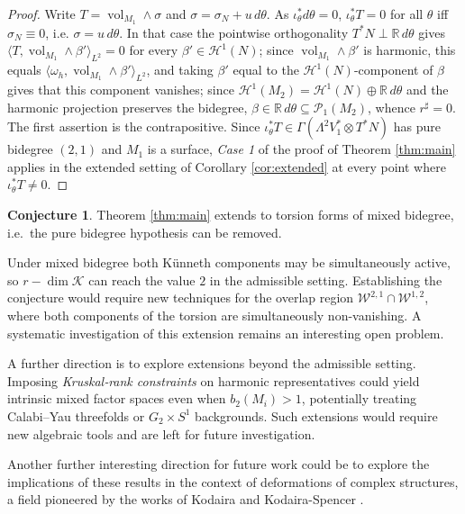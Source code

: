 \documentclass[11pt,reqno]{amsart}
\theoremstyle{plain}
\theoremstyle{definition}
\newtheorem{conjecture}[theorem]{Conjecture}
\numberwithin{equation}{section}
\begin{document}
\begin{proof}
Write $T=\operatorname{vol}_{M_1}\wedge\sigma$ and $\sigma=\sigma_N+u\,d\theta$.
As $\iota_\theta^{*}d\theta=0$, $\iota_\theta^{*}T=0$ for all $\theta$ iff $\sigma_N\equiv0$, i.e. $\sigma=u\,d\theta$.  In that case the pointwise orthogonality $T^{*}N\perp\mathbb{R}\,d\theta$ gives $\langle T,\operatorname{vol}_{M_1}\wedge\beta'\rangle_{L^2}=0$ for every $\beta'\in\mathcal{H}^{1}(N)$; since $\operatorname{vol}_{M_1}\wedge\beta'$ is harmonic, this equals $\langle\omega_h,\operatorname{vol}_{M_1}\wedge\beta'\rangle_{L^2}$, and taking $\beta'$ equal to the $\mathcal{H}^{1}(N)$-component of $\beta$ gives that this component vanishes; since
$\mathcal{H}^{1}(M_2)=\mathcal{H}^{1}(N)\oplus\mathbb{R}\,d\theta$ and the
harmonic projection preserves the bidegree, $\beta\in\mathbb{R}\,d\theta
\subseteq\mathcal{P}_1(M_2)$, whence $r^{\sharp}=0$.  The first assertion is the contrapositive.  Since $\iota_\theta^{*}T\in\Gamma(\Lambda^2V_1^{*}\otimes T^{*}N)$
has pure bidegree $(2,1)$ and $M_1$ is a surface, \emph{Case 1} of the proof of Theorem \ref{thm:main} applies in the extended setting of Corollary \ref{cor:extended} at every point where $\iota_\theta^{*}T\neq0$.
\end{proof}

\begin{conjecture}\label{conj:mixed}
Theorem \ref{thm:main} extends to torsion forms of mixed bidegree, i.e.\ the pure bidegree hypothesis can be removed.
\end{conjecture}

Under mixed bidegree both K\"unneth components may be simultaneously active, so $r-\dim\mathcal{K}$ can reach the value $2$ in the admissible setting. Establishing the conjecture would require new techniques for the overlap region $\mathcal{W}^{2,1}\cap\mathcal{W}^{1,2}$, where both components of the torsion are simultaneously non-vanishing.  A systematic investigation of this extension remains an interesting open problem.

A further direction is to explore extensions beyond the admissible setting. Imposing \emph{Kruskal‑rank constraints} on harmonic representatives could yield intrinsic mixed factor spaces even when \(b_2(M_i) > 1\), potentially treating Calabi–Yau threefolds or \(G_2 \times S^1\) backgrounds. Such extensions would require new algebraic tools and are left for future investigation.

Another further interesting direction for future work could be to explore the implications of these results in the context of deformations of complex structures, a field pioneered by the works of Kodaira \cite{K (1958)} and Kodaira-Spencer \cite{K-S (1960)}.
\end{document}
